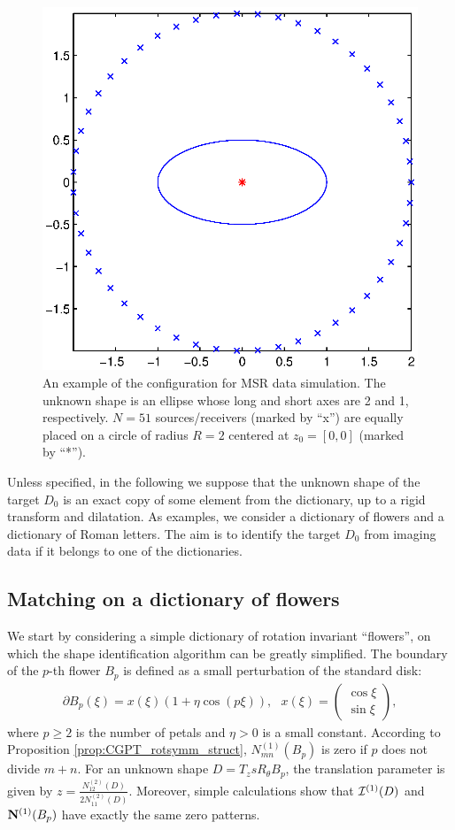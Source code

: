 \begin{figure}[htp]
  \centering
  \includegraphics[width=.6\textwidth]{dico/figures/fig1_ellipse_std}
  \caption{An example of the configuration for MSR data
    simulation. The unknown shape is an ellipse whose long and short
    axes are 2 and 1, respectively. $N=51$ sources/receivers (marked by
    ``x'') are equally placed on a circle of radius $R=2$ centered at
    $z_0=[0,0]$ (marked by ``*'').}
  \label{fig:data_acq_dico}
\end{figure}



Unless specified, in the following
we suppose that the unknown shape of the target $D_0$ is an exact
copy of some element from the dictionary, up to a rigid transform
and dilatation. As examples, we consider a dictionary of flowers
and a dictionary of Roman letters. The aim is to identify the
target $D_0$ from imaging data if it belongs to one of the
dictionaries.


\subsection{Matching on a dictionary of flowers}\label{sec:match-dico-flower}
We start by considering a simple dictionary of rotation invariant
``flowers'', on which the shape identification algorithm can be
greatly simplified. The boundary of the $p$-th flower $B_p$ is
defined as a small perturbation of the standard disk:
\begin{align}
  \partial B_p(\xi) = x(\xi)(1+\eta \cos(p\xi)), \mbox{ } x(\xi)=
  \begin{pmatrix}
    \cos\xi\\ \sin\xi
  \end{pmatrix} ,
  \label{eq:flower}
\end{align}
where $p\geq 2$ is the number of petals and $\eta>0$ is a small
constant. According to Proposition \ref{prop:CGPT_rotsymm_struct},
$N_{mn}^{(1)}(B_p)$ is zero if $p$ does not divide $m+n$.  For an
unknown shape $D=T_zsR_\theta B_p$, the translation parameter is
given by $z=\frac{N_{12}^{(2)}(D)}{2N_{11}^{(2)}(D)}$. Moreover, simple
calculations show that $\mathcal{I}^{(1)}(D)$ and $\mathbf{N}^{(1)}(B_p)$ have exactly the
same zero patterns.


